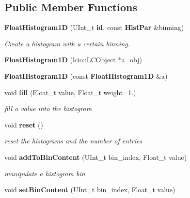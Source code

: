 \subsection*{Public Member Functions}
\begin{DoxyCompactItemize}
\item 
{\bf Float\-Histogram1\-D} (U\-Int\-\_\-t {\bf id}, const {\bf Hist\-Par} \&binning)
\begin{DoxyCompactList}\small\item\em Create a histogram with a certain binning. \end{DoxyCompactList}\item 
{\bfseries Float\-Histogram1\-D} (lcio\-::\-L\-C\-Object $\ast$a\-\_\-obj)\label{classhistmgr_1_1FloatHistogram1D_a1032bc84dcbaa4a6210fb0ee6b5088d7}

\item 
{\bfseries Float\-Histogram1\-D} (const {\bf Float\-Histogram1\-D} \&a)\label{classhistmgr_1_1FloatHistogram1D_af31379e3a83520eac73d5c1609002303}

\item 
void {\bf fill} (Float\-\_\-t value, Float\-\_\-t weight=1.)\label{classhistmgr_1_1FloatHistogram1D_aef71989b1c5ad2fc370ee96fb4022213}

\begin{DoxyCompactList}\small\item\em fill a value into the histogram \end{DoxyCompactList}\item 
void {\bf reset} ()\label{classhistmgr_1_1FloatHistogram1D_ab6020a2d0902ddc0d6b6f21ae6c579d9}

\begin{DoxyCompactList}\small\item\em reset the histograms and the number of entries \end{DoxyCompactList}\item 
void {\bf add\-To\-Bin\-Content} (U\-Int\-\_\-t bin\-\_\-index, Float\-\_\-t value)\label{classhistmgr_1_1FloatHistogram1D_ad0af3ba0d429ed031d43def85d3ca602}

\begin{DoxyCompactList}\small\item\em manipulate a histogram bin \end{DoxyCompactList}\item 
void {\bf set\-Bin\-Content} (U\-Int\-\_\-t bin\-\_\-index, Float\-\_\-t value)\label{classhistmgr_1_1FloatHistogram1D_a7c3aa74ff2e33c25678d73a0e127ef9f}


\end{DoxyCompactItemize}
